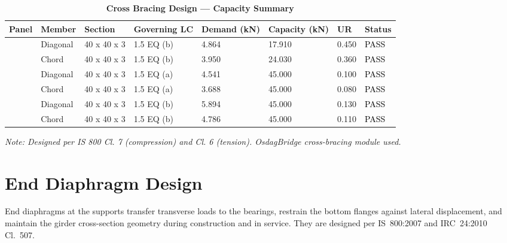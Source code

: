 \documentclass[12pt,a4paper]{report}
\numberwithin{table}{chapter}
\numberwithin{figure}{chapter}
\begin{document}
\vspace{1em}
\begin{longtable}{|C{2.0cm}|L{1.8cm}|C{2.2cm}|C{3.0cm}|C{1.8cm}|C{1.8cm}|C{1.2cm}|C{1.8cm}|}
\caption{\textbf{Cross Bracing Design --- Capacity Summary}}
\hline
\textbf{Panel} & \textbf{Member} & \textbf{Section} & \textbf{Governing LC} & \textbf{Demand (kN)} & \textbf{Capacity (kN)} & \textbf{UR} & \textbf{Status} \\[6pt]
\hline
{} & Diagonal & 40 x 40 x 3 & 1.5 EQ (b) & 4.864 & 17.910 & 0.450 & \textcolor{black}{PASS} \\[6pt]
 & Chord & 40 x 40 x 3 & 1.5 EQ (b) & 3.950 & 24.030 & 0.360 & \textcolor{black}{PASS} \\[6pt]
\hline
{} & Diagonal & 40 x 40 x 3 & 1.5 EQ (a) & 4.541 & 45.000 & 0.100 & \textcolor{black}{PASS} \\[6pt]
 & Chord & 40 x 40 x 3 & 1.5 EQ (a) & 3.688 & 45.000 & 0.080 & \textcolor{black}{PASS} \\[6pt]
\hline
{} & Diagonal & 40 x 40 x 3 & 1.5 EQ (b) & 5.894 & 45.000 & 0.130 & \textcolor{black}{PASS} \\[6pt]
 & Chord & 40 x 40 x 3 & 1.5 EQ (b) & 4.786 & 45.000 & 0.110 & \textcolor{black}{PASS} \\[6pt]
\hline
\end{longtable}
\noindent\textit{Note: Designed per IS 800 Cl. 7 (compression) and Cl. 6 (tension). OsdagBridge cross-bracing module used.}

\section{End Diaphragm Design}
\label{sec:end-diaphragm}

End diaphragms at the supports transfer transverse loads to the bearings, restrain the bottom flanges against lateral displacement, and maintain the girder cross-section geometry during construction and in service. They are designed per IS~800:2007 and IRC~24:2010 Cl.~507.

\vspace{1em}

\vspace{0.4em}
\noindent
\setlength{\tabcolsep}{4pt}
\setlength{\LTleft}{0pt}
\setlength{\LTright}{\fill}
\end{document}
